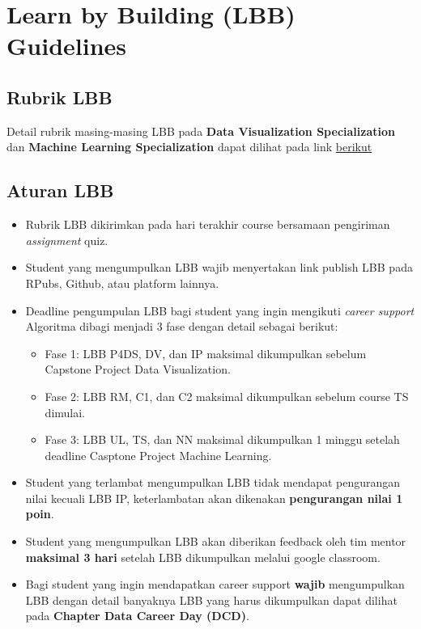 \documentclass[
]{book}
\providecommand{\tightlist}{%
  \setlength{\itemsep}{0pt}\setlength{\parskip}{0pt}}
\begin{document}
\hypertarget{learn-by-building-lbb-guidelines}{%
\section{Learn by Building (LBB) Guidelines}\label{learn-by-building-lbb-guidelines}}

\hypertarget{rubrik-lbb}{%
\subsection{Rubrik LBB}\label{rubrik-lbb}}

Detail rubrik masing-masing LBB pada \textbf{Data Visualization Specialization} dan \textbf{Machine Learning Specialization} dapat dilihat pada link \href{https://rpubs.com/AlgoritmaAcademy/lbb}{berikut}

\hypertarget{aturan-lbb}{%
\subsection{Aturan LBB}\label{aturan-lbb}}

\begin{itemize}
\item
  Rubrik LBB dikirimkan pada hari terakhir course bersamaan pengiriman \emph{assignment} quiz.
\item
  Student yang mengumpulkan LBB wajib menyertakan link publish LBB pada RPubs, Github, atau platform lainnya.
\item
  Deadline pengumpulan LBB bagi student yang ingin mengikuti \emph{career support} Algoritma dibagi menjadi 3 fase dengan detail sebagai berikut:

  \begin{itemize}
  \tightlist
  \item
    Fase 1: LBB P4DS, DV, dan IP maksimal dikumpulkan sebelum Capstone Project Data Visualization.
  \item
    Fase 2: LBB RM, C1, dan C2 maksimal dikumpulkan sebelum course TS dimulai.
  \item
    Fase 3: LBB UL, TS, dan NN maksimal dikumpulkan 1 minggu setelah deadline Casptone Project Machine Learning.
  \end{itemize}
\item
  Student yang terlambat mengumpulkan LBB tidak mendapat pengurangan nilai kecuali LBB IP, keterlambatan akan dikenakan \textbf{pengurangan nilai 1 poin}.
\item
  Student yang mengumpulkan LBB akan diberikan feedback oleh tim mentor \textbf{maksimal 3 hari} setelah LBB dikumpulkan melalui google classroom.
\item
  Bagi student yang ingin mendapatkan career support \textbf{wajib} mengumpulkan LBB dengan detail banyaknya LBB yang harus dikumpulkan dapat dilihat pada \textbf{Chapter Data Career Day (DCD)}.
\end{itemize}
\end{document}
